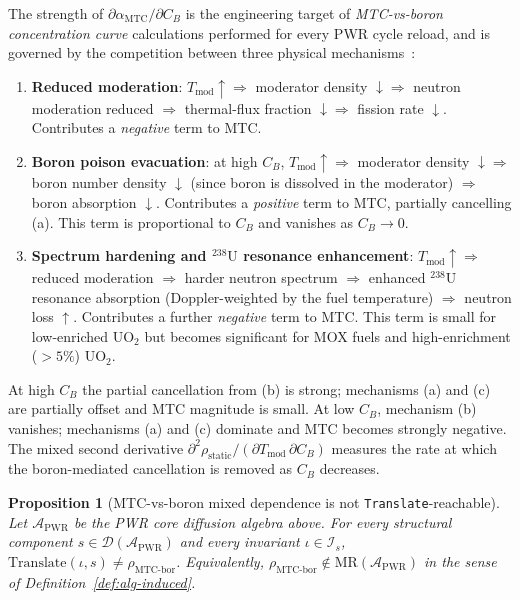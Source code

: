 \documentclass[acmsmall,screen,review]{acmart}
\newtheorem{proposition}{Proposition}
\begin{document}
The strength of $\partial \alpha_{\mathrm{MTC}}/\partial C_{B}$ is the engineering target of \emph{MTC-vs-boron concentration curve} calculations performed for every PWR cycle reload, and is governed by the competition between three physical mechanisms~\cite[\S3.4]{Stacey2007}:
\begin{enumerate}[nosep,leftmargin=*]
  \item[(a)] \textbf{Reduced moderation}: $T_{\mathrm{mod}} \uparrow \Rightarrow$ moderator density $\downarrow \Rightarrow$ neutron moderation reduced $\Rightarrow$ thermal-flux fraction $\downarrow \Rightarrow$ fission rate $\downarrow$. Contributes a \emph{negative} term to MTC.
  \item[(b)] \textbf{Boron poison evacuation}: at high $C_{B}$, $T_{\mathrm{mod}} \uparrow \Rightarrow$ moderator density $\downarrow \Rightarrow$ boron number density $\downarrow$ (since boron is dissolved in the moderator) $\Rightarrow$ boron absorption $\downarrow$. Contributes a \emph{positive} term to MTC, partially cancelling (a). This term is proportional to $C_{B}$ and vanishes as $C_{B} \to 0$.
  \item[(c)] \textbf{Spectrum hardening and $^{238}\mathrm{U}$ resonance enhancement}: $T_{\mathrm{mod}} \uparrow \Rightarrow$ reduced moderation $\Rightarrow$ harder neutron spectrum $\Rightarrow$ enhanced $^{238}\mathrm{U}$ resonance absorption (Doppler-weighted by the fuel temperature) $\Rightarrow$ neutron loss $\uparrow$. Contributes a further \emph{negative} term to MTC. This term is small for low-enriched UO$_{2}$ but becomes significant for MOX fuels and high-enrichment ($>5\%$) UO$_{2}$.
\end{enumerate}

At high $C_{B}$ the partial cancellation from (b) is strong; mechanisms (a) and (c) are partially offset and MTC magnitude is small. At low $C_{B}$, mechanism (b) vanishes; mechanisms (a) and (c) dominate and MTC becomes strongly negative. The mixed second derivative $\partial^{2}\rho_{\mathrm{static}}/(\partial T_{\mathrm{mod}}\,\partial C_{B})$ measures the rate at which the boron-mediated cancellation is removed as $C_{B}$ decreases.

\begin{proposition}[MTC-vs-boron mixed dependence is not \texttt{Translate}-reachable]
\label{prop:mtcbor}
Let $\mathcal{A}_{\mathrm{PWR}}$ be the PWR core diffusion algebra above. For every structural component $s \in \mathcal{D}(\mathcal{A}_{\mathrm{PWR}})$ and every invariant $\iota \in \mathcal{I}_{s}$, $\mathrm{Translate}(\iota, s) \neq \rho_{\mathrm{MTC\text{-}bor}}$. Equivalently, $\rho_{\mathrm{MTC\text{-}bor}} \notin \mathrm{MR}(\mathcal{A}_{\mathrm{PWR}})$ in the sense of Definition~\ref{def:alg-induced}.
\end{proposition}
\end{document}
